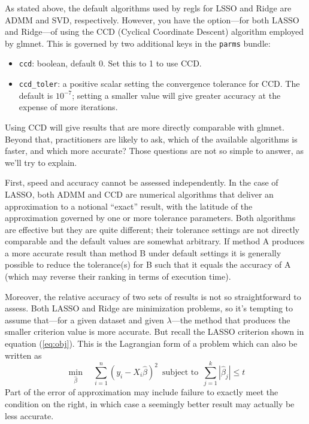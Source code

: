 \documentclass{article}
\begin{document}
As stated above, the default algorithms used by \textsf{regls} for
LSSO and Ridge are ADMM and SVD, respectively. However, you have the
option---for both LASSO and Ridge---of using the CCD (Cyclical
Coordinate Descent) algorithm employed by \textsf{glmnet}. This is
governed by two additional keys in the \texttt{parms} bundle:
\begin{itemize}
\item \texttt{ccd}: boolean, default 0. Set this to 1 to use CCD.
\item \texttt{ccd\_toler}: a positive scalar setting the convergence
  tolerance for CCD. The default is $10^{-7}$; setting a smaller value
  will give greater accuracy at the expense of more iterations.
\end{itemize}

Using CCD will give results that are more directly comparable with
\textsf{glmnet}. Beyond that, practitioners are likely to ask, which
of the available algorithms is faster, and which more accurate? Those
questions are not so simple to answer, as we'll try to explain.

First, speed and accuracy cannot be assessed independently. In the
case of LASSO, both ADMM and CCD are numerical algorithms that deliver
an approximation to a notional ``exact'' result, with the latitude of
the approximation governed by one or more tolerance parameters. Both
algorithms are effective but they are quite different; their tolerance
settings are not directly comparable and the default values are
somewhat arbitrary. If method A produces a more accurate result than
method B under default settings it is generally possible to reduce the
tolerance(s) for B such that it equals the accuracy of A (which may
reverse their ranking in terms of execution time).

Moreover, the relative accuracy of two sets of results is not so
straightforward to assess. Both LASSO and Ridge are minimization
problems, so it's tempting to assume that---for a given dataset and
given $\lambda$---the method that produces the smaller criterion value
is more accurate. But recall the LASSO criterion shown in equation
(\ref{eq:obj}). This is the Lagrangian form of a problem which can
also be written as
\[
  \min_{\hat{\beta}} \quad
  \sum_{i=1}^n (y_i - X_i\hat{\beta})^2 \,\mbox{ subject to }\,
  \sum_{j=1}^k |\hat{\beta}_j| \leq t
\]
Part of the error of approximation may include failure to exactly meet
the condition on the right, in which case a seemingly better result
may actually be less accurate.
\end{document}
